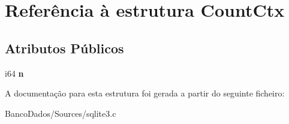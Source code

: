 \hypertarget{struct_count_ctx}{\section{Referência à estrutura Count\-Ctx}
\label{struct_count_ctx}
}
\subsection*{Atributos Públicos}
\begin{DoxyCompactItemize}
\item 
\hypertarget{struct_count_ctx_a141c718918dbfaa183f772bfd7a516f4}{i64 {\bfseries n}}\label{struct_count_ctx_a141c718918dbfaa183f772bfd7a516f4}

\end{DoxyCompactItemize}


A documentação para esta estrutura foi gerada a partir do seguinte ficheiro\-:\begin{DoxyCompactItemize}
\item 
Banco\-Dados/\-Sources/sqlite3.\-c\end{DoxyCompactItemize}
